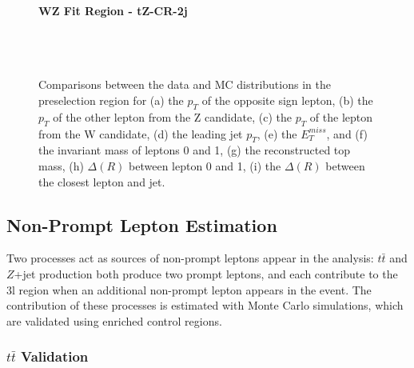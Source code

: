 \begin{figure}[H] 
    \textbf{WZ Fit Region - tZ-CR-2j}\\
    \\
    \\
    \\
    \caption{Comparisons between the data and MC distributions in the preselection region for (a) the $p_T$ of the opposite sign lepton, (b) the $p_T$ of the other lepton from the Z candidate, (c) the $p_T$ of the lepton from the W candidate, (d) the leading jet $p_T$, (e) the $E_T^{miss}$, and (f) the invariant mass of leptons 0 and 1, (g) the reconstructed top mass, (h) $\Delta(R)$ between lepton 0 and 1, (i) the $\Delta(R)$ between the closest lepton and jet.}
    \label{kin:tZ_CR_2j}
\end{figure}

\subsection{Non-Prompt Lepton Estimation}
\label{sec:fakes}

Two processes act as sources of non-prompt leptons appear in the analysis: $t\bar{t}$ and $Z$+jet production both produce two prompt leptons, and each contribute to the 3l region when an additional non-prompt lepton appears in the event. The contribution of these processes is estimated with Monte Carlo simulations, which are validated using enriched control regions.

\subsubsection{$t\bar{t}$ Validation}


